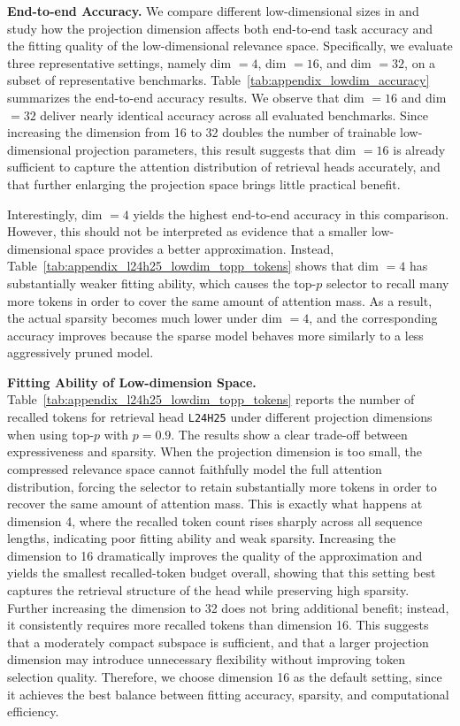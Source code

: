 
\noindent\textbf{End-to-end Accuracy.} We compare different low-dimensional sizes in \name and study how the projection dimension affects both end-to-end task accuracy and the fitting quality of the low-dimensional relevance space. Specifically, we evaluate three representative settings, namely dim $=4$, dim $=16$, and dim $=32$, on a subset of representative benchmarks. Table~\ref{tab:appendix_lowdim_accuracy} summarizes the end-to-end accuracy results. We observe that dim $=16$ and dim $=32$ deliver nearly identical accuracy across all evaluated benchmarks. Since increasing the dimension from 16 to 32 doubles the number of trainable low-dimensional projection parameters, this result suggests that dim $=16$ is already sufficient to capture the attention distribution of retrieval heads accurately, and that further enlarging the projection space brings little practical benefit.

Interestingly, dim $=4$ yields the highest end-to-end accuracy in this comparison. However, this should not be interpreted as evidence that a smaller low-dimensional space provides a better approximation. Instead, Table~\ref{tab:appendix_l24h25_lowdim_topp_tokens} shows that dim $=4$ has substantially weaker fitting ability, which causes the top-$p$ selector to recall many more tokens in order to cover the same amount of attention mass. As a result, the actual sparsity becomes much lower under dim $=4$, and the corresponding accuracy improves because the sparse model behaves more similarly to a less aggressively pruned model.

\noindent\textbf{Fitting Ability of Low-dimension Space.} Table~\ref{tab:appendix_l24h25_lowdim_topp_tokens} reports the number of recalled tokens for retrieval head \texttt{L24H25} under different projection dimensions when using top-$p$ with $p=0.9$. The results show a clear trade-off between expressiveness and sparsity. When the projection dimension is too small, the compressed relevance space cannot faithfully model the full attention distribution, forcing the selector to retain substantially more tokens in order to recover the same amount of attention mass. This is exactly what happens at dimension 4, where the recalled token count rises sharply across all sequence lengths, indicating poor fitting ability and weak sparsity. Increasing the dimension to 16 dramatically improves the quality of the approximation and yields the smallest recalled-token budget overall, showing that this setting best captures the retrieval structure of the head while preserving high sparsity. Further increasing the dimension to 32 does not bring additional benefit; instead, it consistently requires more recalled tokens than dimension 16. This suggests that a moderately compact subspace is sufficient, and that a larger projection dimension may introduce unnecessary flexibility without improving token selection quality. Therefore, we choose dimension 16 as the default setting, since it achieves the best balance between fitting accuracy, sparsity, and computational efficiency.

